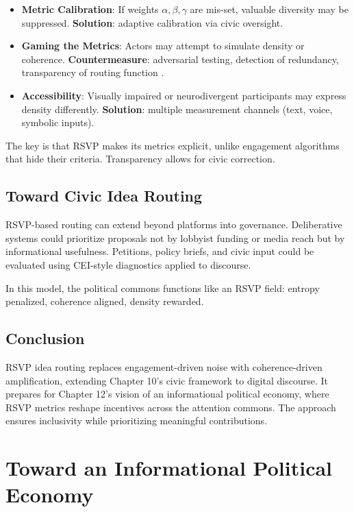 \documentclass[openany]{book}
\begin{document}
\begin{itemize}
    \item \textbf{Metric Calibration}: If weights $\alpha, \beta, \gamma$ are mis-set, valuable diversity may be suppressed. \textbf{Solution}: adaptive calibration via civic oversight.
    \item \textbf{Gaming the Metrics}: Actors may attempt to simulate density or coherence. \textbf{Countermeasure}: adversarial testing, detection of redundancy, transparency of routing function \cite{szegedy2014}.
    \item \textbf{Accessibility}: Visually impaired or neurodivergent participants may express density differently. \textbf{Solution}: multiple measurement channels (text, voice, symbolic inputs).
\end{itemize}

The key is that RSVP makes its metrics explicit, unlike engagement algorithms that hide their criteria. Transparency allows for civic correction.

\section{Toward Civic Idea Routing}

RSVP-based routing can extend beyond platforms into governance. Deliberative systems could prioritize proposals not by lobbyist funding or media reach but by informational usefulness. Petitions, policy briefs, and civic input could be evaluated using CEI-style diagnostics applied to discourse.

In this model, the political commons functions like an RSVP field: entropy penalized, coherence aligned, density rewarded.

\section{Conclusion}

RSVP idea routing replaces engagement-driven noise with coherence-driven amplification, extending Chapter 10’s civic framework to digital discourse. It prepares for Chapter 12’s vision of an informational political economy, where RSVP metrics reshape incentives across the attention commons. The approach ensures inclusivity while prioritizing meaningful contributions.

\chapter{Toward an Informational Political\\ Economy}
\end{document}
